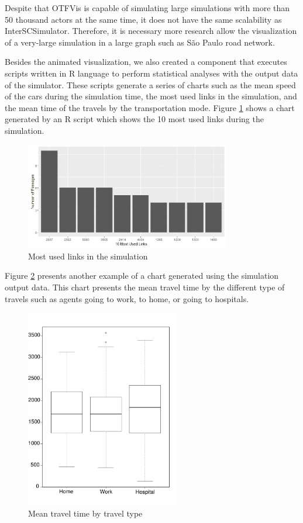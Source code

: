 Despite that OTFVis is capable of simulating large simulations with more than 50 thousand actors at the same time, it does not have the same scalability as InterSCSimulator. Therefore, it is necessary more research allow the visualization of a very-large simulation in a large graph such as S\~ao Paulo road network.

Besides the animated visualization, we also created a component that executes scripts written in R language to perform statistical analyses with the output data of the simulator. These scripts generate a series of charts such as the mean speed of the cars during the simulation time, the most used links in the simulation, and the mean time of the travels by the transportation mode. Figure \ref{fig:chart_example} shows a chart generated by an R script which shows the 10 most used links during the simulation.

\begin{figure}[!htb]
\centering
\includegraphics[width=0.8\textwidth]{figuras/chart_top_ten.jpeg}
\caption{Most used links in the simulation}
\label{fig:chart_example}
\end{figure}

Figure \ref{fig:chart_example2} presents another example of a chart generated using the simulation output data. This chart presents the mean travel time by the different type of travels such as agents going to work, to home, or going to hospitals.

\begin{figure}[!htb]
\centering
\includegraphics[width=0.6\textwidth]{figuras/mode_trip.pdf}
\caption{Mean travel time by travel type}
\label{fig:chart_example2}
\end{figure}


